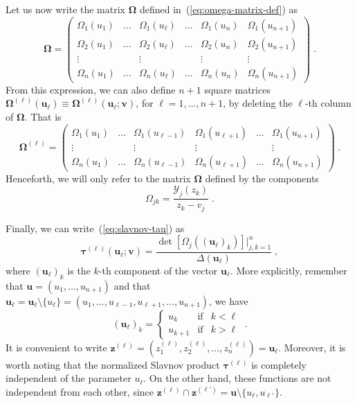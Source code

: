 \documentclass[a4paper,12pt]{amsart}
\begin{document}
Let us now write the matrix \(\bm{\Omega}\) defined
in~(\ref{eq:omega-matrix-def}) as
\begin{equation}
  \bm{\Omega} =
  \begin{pmatrix}
    \Omega_1(u_1) & \dots & \Omega_1(u_\ell) & \dots  & \Omega_1(u_n) & \Omega_1(u_{n+1}) \\
    \Omega_2(u_1) & \dots & \Omega_2(u_\ell) & \dots  & \Omega_2(u_n) & \Omega_2(u_{n+1}) \\
          \vdots &       &   \vdots    &    &     \vdots       & \vdots   \\
    \Omega_n(u_1) & \dots & \Omega_n(u_\ell)& \dots  & \Omega_n(u_n) & \Omega_n(u_{n+1})
  \end{pmatrix}\; .
\end{equation}
From this expression, we can also define \(n+1\) square matrices
\(\bm\Omega^{(\ell)}(\bm{u}_\ell) \equiv \bm\Omega^{(\ell)}(\bm{u}_\ell; \bm{v})\), for
\(\ell = 1, \dots, n+1\), by deleting the \(\ell\)-th column of
\(\bm{\Omega}\). That is
\begin{equation}
  \bm{\Omega}^{(\ell)} =
  \begin{pmatrix}
    \Omega_1(u_1) & \dots & \Omega_1(u_{\ell-1}) & \Omega_1(u_{\ell+1})&\dots & \Omega_1(u_{n+1}) \\
    \vdots &  & \vdots & \vdots & & \vdots \\
    \Omega_n(u_1) & \dots & \Omega_n(u_{\ell-1}) & \Omega_n(u_{\ell+1})&\dots & \Omega_n(u_{n+1})
  \end{pmatrix}\; .
\end{equation}
Henceforth, we will only refer to the matrix
\(\bm{\Omega}\) defined by the components
\begin{equation}
  \label{eq:omega-matrix}
  \Omega_{jk} = \frac{\mathcal{Y}_j(z_k)}{z_k - v_j}\; .
\end{equation}

Finally, we can write~(\ref{eq:slavnov-tau}) as 
\begin{equation}
\label{eq:slavnov-tau-functions}
  \bm{\tau}^{(\ell)}(\bm{u}_\ell; \bm{v}) = \frac{\det [\Omega_j((\bm{u}_\ell)_k)]|_{j,k=1}^n }{\Delta(\bm{u}_\ell)} \; ,
\end{equation}
where \((\bm{u}_\ell)_k \) is the \(k\)-th component of the vector
\(\bm{u}_\ell\).  More explicitly, remember that \(\bm{u} = (u_1,
\dots, u_{n+1})\) and that \(\bm{u}_\ell = \bm{u}_\ell\setminus
\{u_\ell\} = (u_1, \dots, u_{\ell-1}, u_{\ell+ 1}, \dots, u_{n+1})\),
we have
\begin{equation}
  (\bm{u}_\ell)_k =
  \left\{ 
  \begin{matrix}
    u_k & \text{if} & k < \ell\\
    u_{k+1} & \text{if} & k > \ell
  \end{matrix}
  \right. \; .
\end{equation}
It is convenient to write \(\bm{z}^{(\ell)} = (z^{(\ell)}_1,
z^{(\ell)}_2, \dots, z^{(\ell)}_n) = \bm{u}_{\ell}\). Moreover, it is
worth noting that the normalized Slavnov product
\(\bm{\tau}^{(\ell)}\) is completely independent of the parameter
\(u_\ell\). On the other hand, these functions are not independent from each
other, since \(\bm{z}^{(\ell)} \cap \bm{z}^{(\ell')} = \bm{u} \setminus
\{ u_\ell, u_{\ell'}\} \).
\end{document}
